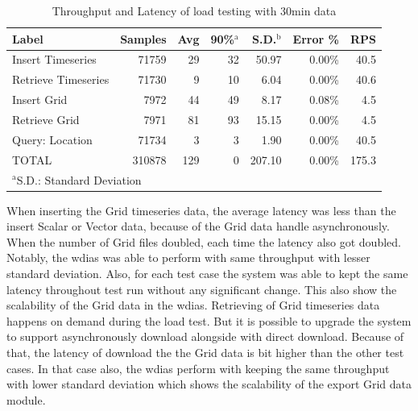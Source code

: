 \documentclass[conference]{IEEEtran}
\begin{document}
\begin{table}[htbp]
\caption{ Throughput and Latency of load testing with 30min data}
\begin{center}
\begin{adjustbox}{width=0.45\textwidth}
\begin{tabular}{|l|r|r|r|r|r|r|}
\hline
\textbf{Label} & \textbf{Samples} & \textbf{Avg} & \textbf{90\%$^{\mathrm{a}}$} & \textbf{S.D.$^{\mathrm{b}}$} & \textbf{Error \%} & \textbf{RPS} \\ \hline
Insert Timeseries & 71759 & 29 & 32 & 50.97 & 0.00\% & 40.5 \\ \hline
Retrieve Timeseries & 71730 & 9 & 10 & 6.04 & 0.00\% & 40.6 \\ \hline
Insert Grid & 7972 & 44 & 49 & 8.17 & 0.08\% & 4.5 \\ \hline
Retrieve Grid & 7971 & 81 & 93 & 15.15 & 0.00\% & 4.5 \\ \hline
Query: Location & 71734 & 3 & 3 & 1.90 & 0.00\% & 40.5 \\ \hline
TOTAL & 310878 & 129 & 0 & 207.10 & 0.00\% & 175.3 \\ \hline
\multicolumn{4}{l}{$^{\mathrm{a}}$S.D.: Standard Deviation}{$^{\mathrm{b}}$90\%: 90\% percentile}
\end{tabular}
\end{adjustbox}
\label{ptab:obs_all_30_min_summary_throughput}
\end{center}
\end{table}

When inserting the Grid timeseries data, the average latency was less than the insert Scalar or Vector data, because of the Grid data handle asynchronously. When the number of Grid files doubled, each time the latency also got doubled. Notably, the \acrshort{wdias} was able to perform with same throughput with lesser standard deviation. Also, for each test case the system was able to kept the same latency throughout test run without any significant change. This also show the scalability of the Grid data in the \acrshort{wdias}.
Retrieving of Grid timeseries data happens on demand during the load test. But it is possible to upgrade the system to support asynchronously download alongside with direct download. Because of that, the latency of download the the Grid data is bit higher than the other test cases. In that case also, the \acrshort{wdias} perform with keeping the same throughput with lower standard deviation which shows the scalability of the export Grid data module.
\end{document}
